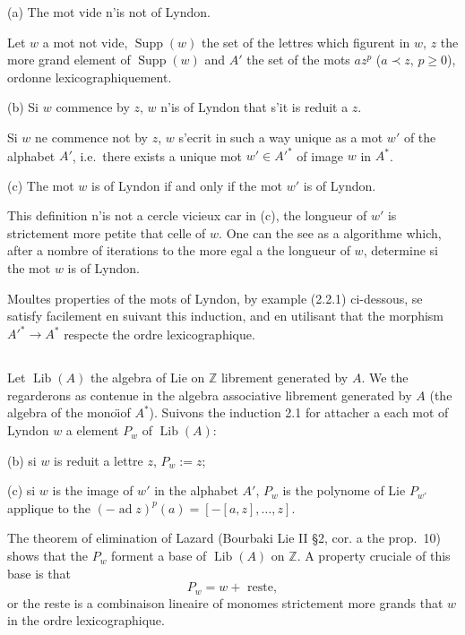\documentclass[11pt,a4paper]{article}
\theoremstyle{plain}
\theoremstyle{definition}
\DeclareMathOperator{\Lib}{Lib}
\DeclareMathOperator{\Supp}{Supp}
\DeclareMathOperator{\ad}{ad}
\newcommand{\Z}{\mathbb{Z}}
\begin{document}
(a) The mot vide n'is not of Lyndon.

Let $w$ a mot not vide, $\Supp(w)$ the set of the lettres which figurent in $w$, $z$ the more grand element of $\Supp(w)$ and $A'$ the set of the mots $az^p$ ($a \prec z$, $p \geq 0$), ordonne lexicographiquement.

(b) Si $w$ commence by $z$, $w$ n'is of Lyndon that s'it is reduit a $z$.

Si $w$ ne commence not by $z$, $w$ s'ecrit in such a way unique as a mot $w'$ of the alphabet $A'$, i.e.~there exists a unique mot $w' \in A'^{\ast}$ of image $w$ in $A^{\ast}$.

(c) The mot $w$ is of Lyndon if and only if the mot $w'$ is of Lyndon.

This definition n'is not a cercle vicieux car in (c), the longueur of $w'$ is strictement more petite that celle of $w$. One can the see as a algorithme which, after a nombre of iterations to the more egal a the longueur of $w$, determine si the mot $w$ is of Lyndon.

Moultes properties of the mots of Lyndon, by example (2.2.1) ci-dessous, se satisfy facilement en suivant this induction, and en utilisant that the morphism $A'^{\ast} \to A^{\ast}$ respecte the ordre lexicographique.

\subsection{}
Let $\Lib(A)$ the algebra of Lie on $\Z$ librement generated by $A$. We the regarderons as contenue in the algebra associative librement generated by $A$ (the algebra of the mono\"{\i}of $A^{\ast}$). Suivons the induction 2.1 for attacher a each mot of Lyndon $w$ a element $P_w$ of $\Lib(A)$:

(b) si $w$ is reduit a lettre $z$, $P_w := z$;

(c) si $w$ is the image of $w'$ in the alphabet $A'$, $P_w$ is the polynome of Lie $P_{w'}$ applique to the $(-\ad z)^p(a) = [-[a,z],\ldots,z]$.

The theorem of elimination of Lazard (Bourbaki Lie II \S 2, cor. a the prop.~10) shows that the $P_w$ forment a base of $\Lib(A)$ on $\Z$. A property cruciale of this base is that
\begin{equation}\label{eq:2.2.1}
P_w = w + \text{ reste},
\end{equation}
or the reste is a combinaison lineaire of monomes strictement more grands that $w$ in the ordre lexicographique.
\end{document}
